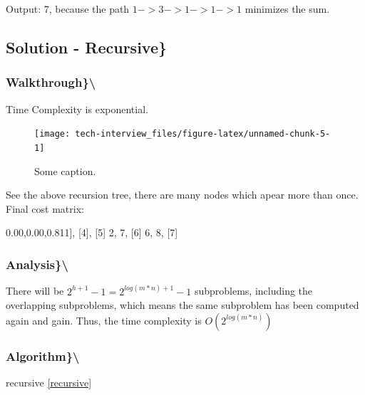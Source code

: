 \documentclass[]{book}
\newenvironment{Shaded}{\begin{snugshade}}{\end{snugshade}}
\newcommand{\DecValTok}[1]{\textcolor[rgb]{0.00,0.00,0.81}{#1}}
\newcommand{\NormalTok}[1]{#1}
\begin{document}
Output: 7, because the path \(1 -> 3 -> 1 -> 1 -> 1\) minimizes the sum.

\hypertarget{solution---recursive}{%
\subsection{Solution - Recursive\}}\label{solution---recursive}}

\hypertarget{walkthrough-44}{%
\subsubsection{Walkthrough\}\textbackslash{}}\label{walkthrough-44}}

Time Complexity is exponential.

\begin{figure}
\texttt{[image: tech-interview\_files/figure-latex/unnamed-chunk-5-1]} \caption{Some caption.}\label{fig:unnamed-chunk-5}
\end{figure}

See the above recursion tree, there are many nodes which apear more than once.
Final cost matrix:

\begin{Shaded}
\begin{Highlighting}[]
\NormalTok{[}\DecValTok{1}\NormalTok{], [}\DecValTok{4}\NormalTok{], [}\DecValTok{5}\NormalTok{]}
\DecValTok{2}\NormalTok{,   }\DecValTok{7}\NormalTok{,   [}\DecValTok{6}\NormalTok{]}
\DecValTok{6}\NormalTok{,   }\DecValTok{8}\NormalTok{,   [}\DecValTok{7}\NormalTok{]}
\end{Highlighting}
\end{Shaded}

\hypertarget{analysis-49}{%
\subsubsection{Analysis\}\textbackslash{}}\label{analysis-49}}

There will be \(2^{h + 1} - 1 = 2^{log(m*n) + 1} - 1\) subproblems, including the overlapping subproblems, which means
the same subproblem has been computed again and gain. Thus, the time complexity is \(O(2^{log(m * n)})\)

\hypertarget{algorithm-49}{%
\subsubsection{Algorithm\}\textbackslash{}}\label{algorithm-49}}

recursive \ref{recursive}
\end{document}
